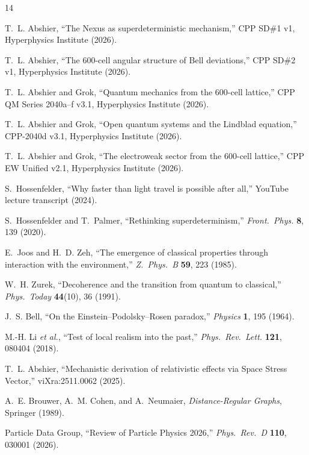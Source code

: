 \documentclass[11pt,a4paper]{article}
\begin{document}

\begin{thebibliography}{14}

T.~L. Abshier,
``The Nexus as superdeterministic mechanism,''
CPP SD\#1 v1, Hyperphysics Institute (2026).

T.~L. Abshier,
``The 600-cell angular structure of Bell deviations,''
CPP SD\#2 v1, Hyperphysics Institute (2026).

T.~L. Abshier and Grok,
``Quantum mechanics from the 600-cell lattice,''
CPP QM Series 2040a--f v3.1, Hyperphysics Institute (2026).

T.~L. Abshier and Grok,
``Open quantum systems and the Lindblad equation,''
CPP-2040d v3.1, Hyperphysics Institute (2026).

T.~L. Abshier and Grok,
``The electroweak sector from the 600-cell lattice,''
CPP EW Unified v2.1, Hyperphysics Institute (2026).

S.~Hossenfelder,
``Why faster than light travel is possible after all,''
YouTube lecture transcript (2024).

S.~Hossenfelder and T.~Palmer,
``Rethinking superdeterminism,''
\textit{Front.\ Phys.} \textbf{8}, 139 (2020).

E.~Joos and H.~D. Zeh,
``The emergence of classical properties through interaction with
the environment,''
\textit{Z.\ Phys.\ B} \textbf{59}, 223 (1985).

W.~H. Zurek,
``Decoherence and the transition from quantum to classical,''
\textit{Phys.\ Today} \textbf{44}(10), 36 (1991).

J.~S. Bell,
``On the Einstein--Podolsky--Rosen paradox,''
\textit{Physics} \textbf{1}, 195 (1964).

M.-H. Li \textit{et al.},
``Test of local realism into the past,''
\textit{Phys.\ Rev.\ Lett.} \textbf{121}, 080404 (2018).

T.~L. Abshier,
``Mechanistic derivation of relativistic effects via Space Stress
Vector,'' viXra:2511.0062 (2025).

A.~E. Brouwer, A.~M. Cohen, and A.~Neumaier,
\textit{Distance-Regular Graphs}, Springer (1989).

Particle Data Group,
``Review of Particle Physics 2026,''
\textit{Phys.\ Rev.\ D} \textbf{110}, 030001 (2026).

\end{thebibliography}
\end{document}

